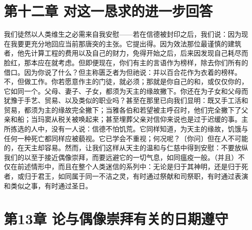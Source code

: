 \section{第十二章 对这一恳求的进一步回答}

我们徒然以人类维生之必需来自我安慰——若在信德被封印之后，我们说：因为现在我要更充分地回应当前那唐突的主张。它提出得。因为效法那位最谨慎的建筑者，他先计算工程的费用以及自己的财力，免得开始之后，后来因发现自己耗尽而脸红，那本应在就考虑。但即便现在，你们有主的言语作为榜样，除去你们所有的借口。因为你说了什么？但主称匮乏者为但祂说：并以百合花作为衣着的榜样。不，但做工作。你若愿意作主的门徒，就必须；那就是你自己的和，或仅仅你的，它如同一个。父母、妻子、子女，都须为天主的缘故撇下。你还在为子女和父母而犹豫于手艺、贸易、以及类似的职业吗？甚至在那里已向我们显明：既又手工活和贸易，都须为主的缘故完全撇下；当雅各伯和若望被主呼召时，他们完全撇下了父亲和船；当玛窦从税关被唤起来；甚至埋葬父亲对信仰来说也是过于迟缓的事。主所拣选的人中，没有一人说：信德不怕饥荒。它同样知道，为天主的缘故，饥饿与任何一种死亡都同样应被藐视。它已学会不重视；何况呢？〔你问〕但在人不可能的，在天主却容易。然而，让我们这样从天主的温和与仁慈中得到安慰：不要放纵我们的以至于接近偶像崇拜，而要远避它的一切气息，如同瘟疫一般。（并且）不仅在前述情形中，而且在整个人类迷信的系列中：无论是归于其神明，还是归于死者，或归于君王，如同属于同一不洁之灵，有时通过祭献和司祭职，有时通过表演和类似之事，有时通过圣日。\par


\section{第13章 论与偶像崇拜有关的日期遵守}

